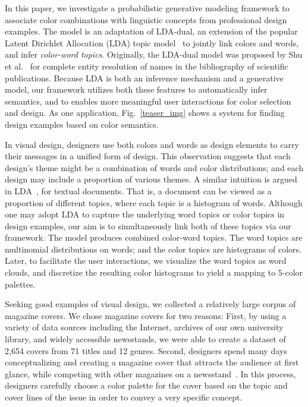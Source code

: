 \documentclass[prodmode,acmtochi]{acmsmall}
\begin{document}
In this paper, we investigate a probabilistic generative modeling framework to associate color combinations with linguistic concepts from professional design examples. The model is an adaptation of LDA-dual, an extension of the popular Latent Dirichlet Allocation (LDA) topic model~\cite{blei2003latent} to jointly link colors and words, and infer \emph{color-word topics}.
Originally, the LDA-dual model was proposed by Shu et al.~\cite{shu2009latent} for complete entity resolution of names in the bibliography of scientific publications.
Because LDA is both an inference mechanism and a generative model, our framework utilizes both these features to automatically infer semantics, and to enables more meaningful user interactions for color selection and design. As one application, Fig.~\ref{teaser_img} shows a system for finding design examples based on color semantics.

In visual design, designers use both colors and words as design elements to carry their messages in a unified form of design.
This observation suggests that each design's
theme might be a combination of words and color distributions; and each
design may include a proportion of various themes.  A similar intuition
is argued in LDA~\cite{blei2003latent}, for textual documents.  That is, a document can be
viewed as a proportion of different topics, where each topic is a histogram of words.
Although one may adopt LDA to capture the underlying word topics or color topics in design examples, our aim is to simultaneously link both of these topics via our framework.
The model produces combined color-word topics. The word topics are multinomial distributions on words; and the color topics are histograms of colors.
Later, to facilitate the user interactions, we visualize the word topics as word clouds, and discretize the resulting color histograms to yield a mapping to 5-color palettes.

Seeking good examples of visual design, we collected a relatively large
corpus of magazine covers.  We chose magazine covers for two reasons:
First, by using a variety of data sources including the Internet,
archives of our own university library, and widely accessible
newsstands, we were able to create a dataset of 2,654 covers from 71
titles and 12 genres.  Second, designers spend many days conceptualizing and creating
a magazine cover that attracts the audience at first glance, while
competing with other magazines on a newsstand~\cite{magbook}.  In this
process, designers carefully choose a color palette for the cover based on
the topic and cover lines of the issue in order to convey a very specific concept.
\end{document}
